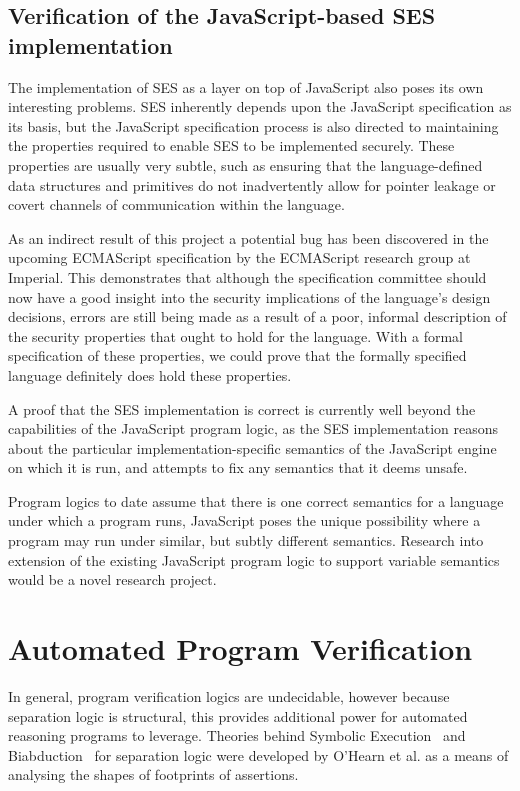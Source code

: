 \documentclass[a4paper,notitlepage]{report}
\begin{document}
\subsection{Verification of the JavaScript-based SES implementation}
The implementation of SES as a layer on top of JavaScript also poses its own
interesting problems. SES inherently depends upon the JavaScript specification
as its basis, but the JavaScript specification process is also directed to
maintaining the properties required to enable SES to be implemented securely.
These properties are usually very subtle, such as ensuring that the
language-defined data structures and primitives do not inadvertently allow for
pointer leakage or covert channels of communication within the language.

As an indirect result of this project a potential bug has been discovered in the
upcoming ECMAScript specification by the ECMAScript research group at Imperial.
This demonstrates that although the
specification committee should now have a good insight into the security
implications of the language's design decisions, errors are still being made as
a result of a poor, informal description of the security properties that ought
to hold for the language. With a formal specification of these properties, we
could prove that the formally specified language definitely does hold these
properties.

A proof that the SES implementation is correct is currently well beyond the
capabilities of the JavaScript program logic, as the SES implementation reasons
about the particular implementation-specific semantics of the JavaScript engine
on which it is run, and attempts to fix any semantics that it deems unsafe.

Program logics to date assume that there is one correct semantics for a language
under which a program runs, JavaScript poses the unique possibility where a
program may run under similar, but subtly different semantics. Research into
extension of the existing JavaScript program logic to support variable semantics
would be a novel research project.

\section{Automated Program Verification}
In general, program verification logics are undecidable, however because 
separation logic is structural, this provides additional power for automated
reasoning programs to leverage. Theories behind Symbolic
Execution~\cite{symb-exec} and
Biabduction~\cite{1480917} for separation logic were developed by O'Hearn et al.
as a means of analysing the shapes of footprints of assertions.
\end{document}
